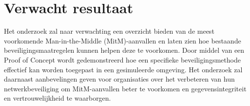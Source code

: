 \section{Verwacht resultaat}%
\label{sec:verwachte_resultaten}

Het onderzoek zal naar verwachting een overzicht bieden van de meest voorkomende Man-in-the-Middle (MitM)-aanvallen en laten zien hoe bestaande beveiligingsmaatregelen kunnen helpen deze te voorkomen. Door middel van een Proof of Concept wordt gedemonstreerd hoe een specifieke beveiligingsmethode effectief kan worden toegepast in een gesimuleerde omgeving. Het onderzoek zal daarnaast aanbevelingen geven voor organisaties over het verbeteren van hun netwerkbeveiliging om MitM-aanvallen beter te voorkomen en gegevensintegriteit en vertrouwelijkheid te waarborgen.